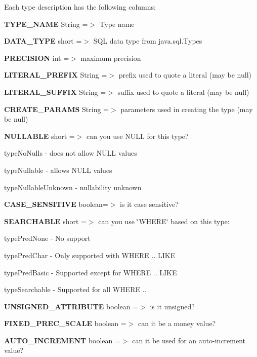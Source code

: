 Each type description has the following columns\+: 
\begin{DoxyEnumerate}
\item {\bfseries T\+Y\+P\+E\+\_\+\+N\+A\+ME} String =$>$ Type name 
\item {\bfseries D\+A\+T\+A\+\_\+\+T\+Y\+PE} short =$>$ S\+QL data type from java.\+sql.\+Types 
\item {\bfseries P\+R\+E\+C\+I\+S\+I\+ON} int =$>$ maximum precision 
\item {\bfseries L\+I\+T\+E\+R\+A\+L\+\_\+\+P\+R\+E\+F\+IX} String =$>$ prefix used to quote a literal (may be null) 
\item {\bfseries L\+I\+T\+E\+R\+A\+L\+\_\+\+S\+U\+F\+F\+IX} String =$>$ suffix used to quote a literal (may be null) 
\item {\bfseries C\+R\+E\+A\+T\+E\+\_\+\+P\+A\+R\+A\+MS} String =$>$ parameters used in creating the type (may be null) 
\item {\bfseries N\+U\+L\+L\+A\+B\+LE} short =$>$ can you use N\+U\+LL for this type? 
\begin{DoxyItemize}
\item type\+No\+Nulls -\/ does not allow N\+U\+LL values 
\item type\+Nullable -\/ allows N\+U\+LL values 
\item type\+Nullable\+Unknown -\/ nullability unknown 
\end{DoxyItemize}
\item {\bfseries C\+A\+S\+E\+\_\+\+S\+E\+N\+S\+I\+T\+I\+VE} boolean=$>$ is it case sensitive? 
\item {\bfseries S\+E\+A\+R\+C\+H\+A\+B\+LE} short =$>$ can you use \char`\"{}\+W\+H\+E\+R\+E\char`\"{} based on this type\+: 
\begin{DoxyItemize}
\item type\+Pred\+None -\/ No support 
\item type\+Pred\+Char -\/ Only supported with W\+H\+E\+RE .. L\+I\+KE 
\item type\+Pred\+Basic -\/ Supported except for W\+H\+E\+RE .. L\+I\+KE 
\item type\+Searchable -\/ Supported for all W\+H\+E\+RE .. 
\end{DoxyItemize}
\item {\bfseries U\+N\+S\+I\+G\+N\+E\+D\+\_\+\+A\+T\+T\+R\+I\+B\+U\+TE} boolean =$>$ is it unsigned? 
\item {\bfseries F\+I\+X\+E\+D\+\_\+\+P\+R\+E\+C\+\_\+\+S\+C\+A\+LE} boolean =$>$ can it be a money value? 
\item {\bfseries A\+U\+T\+O\+\_\+\+I\+N\+C\+R\+E\+M\+E\+NT} boolean =$>$ can it be used for an auto-\/increment value? 

\end{DoxyEnumerate}
